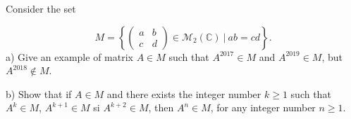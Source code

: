 Consider the set

\[M = \left\{ 
\begin{pmatrix}
a & b \\
c & d
\end{pmatrix}
\in\mathcal{M}_2(\mathbb{C})\ |\ ab = cd
\right\}.\]
a) Give an example of matrix $A\in M$ such that $A^{2017}\in M$ and $A^{2019}\in M$, but $A^{2018}\notin M$.

b) Show that if $A\in M$ and there exists the integer number $k\ge 1$ such that $A^k \in M$, $A^{k + 1}\in M$ si $A^{k + 2} \in M$, then $A^n\in M$, for any integer number $n\ge 1$.